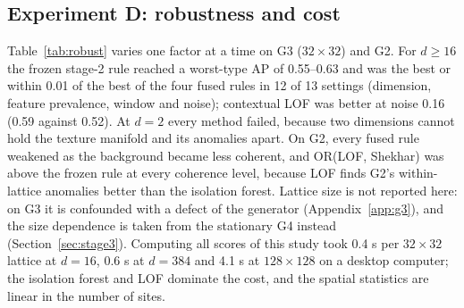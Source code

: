 \documentclass[preprint,review,12pt]{elsarticle}
\begin{document}
\subsection{Experiment D: robustness and cost}
Table~\ref{tab:robust} varies one factor at a time on G3 ($32\times32$) and G2. For $d\ge16$ the frozen stage-2 rule reached a worst-type AP of 0.55--0.63 and was the best or within 0.01 of the best of the four fused rules in 12 of 13 settings (dimension, feature prevalence, window and noise); contextual LOF was better at noise 0.16 (0.59 against 0.52). At $d=2$ every method failed, because two dimensions cannot hold the texture manifold and its anomalies apart. On G2, every fused rule weakened as the background became less coherent, and OR(LOF, Shekhar) was above the frozen rule at every coherence level, because LOF finds G2's within-lattice anomalies better than the isolation forest. Lattice size is not reported here: on G3 it is confounded with a defect of the generator (Appendix~\ref{app:g3}), and the size dependence is taken from the stationary G4 instead (Section~\ref{sec:stage3}). Computing all scores of this study took 0.4 s per $32\times32$ lattice at $d=16$, 0.6 s at $d=384$ and 4.1 s at $128\times128$ on a desktop computer; the isolation forest and LOF dominate the cost, and the spatial statistics are linear in the number of sites.
\end{document}
